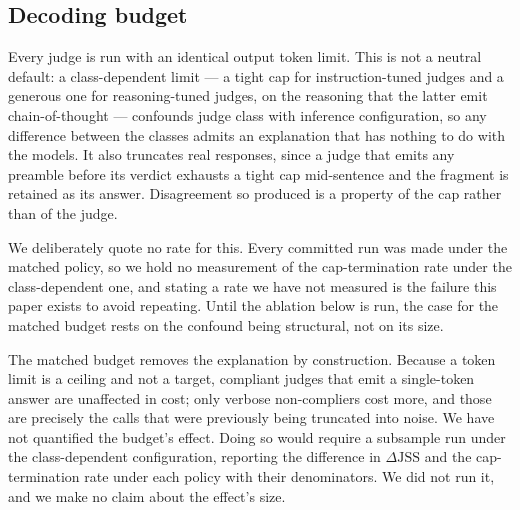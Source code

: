 \subsection{Decoding budget}
\label{sec:budget}

Every judge is run with an identical output token limit. This is not a neutral
default: a class-dependent limit --- a tight cap for instruction-tuned judges and
a generous one for reasoning-tuned judges, on the reasoning that the latter emit
chain-of-thought --- confounds judge class with inference configuration, so any
difference between the classes admits an explanation that has nothing to do with
the models. It also truncates real responses, since a judge that emits any
preamble before its verdict exhausts a tight cap mid-sentence and the fragment is
retained as its answer. Disagreement so produced is a property of the cap rather
than of the judge.

We deliberately quote no rate for this. Every committed run was made under the
matched policy, so we hold no measurement of the cap-termination rate under the
class-dependent one, and stating a rate we have not measured is the failure this
paper exists to avoid repeating. Until the ablation below is run, the case for
the matched budget rests on the confound being structural, not on its size.

The matched budget removes the explanation by construction. Because a token
limit is a ceiling and not a target, compliant judges that emit a single-token
answer are unaffected in cost; only verbose non-compliers cost more, and those
are precisely the calls that were previously being truncated into noise. We
have not quantified the budget's effect. Doing so would require a subsample run
under the class-dependent configuration, reporting the difference in
$\Delta\mathrm{JSS}$ and the cap-termination rate under each policy with their
denominators. We did not run it, and we make no claim about the effect's size.
